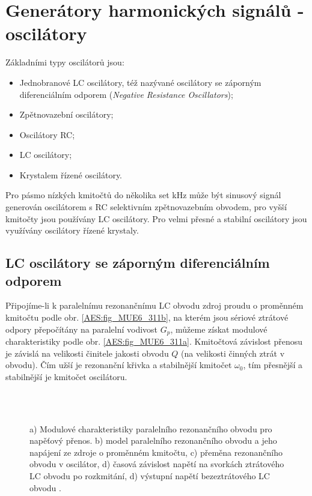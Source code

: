   \section{Generátory harmonických signálů - oscilátory}
    Základními typy oscilátorů jsou:
    \begin{itemize}[noitemsep]
      \item Jednobranové LC oscilátory, též nazývané oscilátory se záporným diferenciálním odporem 
            (\emph{Negative Resistance Oscillators});
      \item Zpětnovazební oscilátory;
      \item Oscilátory RC;
      \item LC oscilátory;
      \item Krystalem řízené oscilátory.
    \end{itemize}

    Pro pásmo nízkých kmitočtů do několika set kHz může být sinusový signál generován oscilátorem s 
    RC selektivním zpětnovazebním obvodem, pro vyšší kmitočty jsou používány LC oscilátory. Pro 
    velmi přesné a stabilní oscilátory jsou využívány oscilátory řízené krystaly.
    
    \subsection{LC oscilátory se záporným diferenciálním odporem}
      Připojíme-li k paralelnímu rezonančnímu LC obvodu zdroj proudu o proměnném kmitočtu podle 
      obr. \ref{AES:fig_MUE6_311b}, na kterém jsou sériové ztrátové odpory přepočítány na paralelní 
      vodivost \(G_p\), můžeme získat modulové charakteristiky podle obr. \ref{AES:fig_MUE6_311a}. 
      Kmitočtová závislost přenosu je závislá na velikosti činitele jakosti obvodu \(Q\) (na 
      velikosti činných ztrát v obvodu). Čím užší je rezonanční křivka a stabilnější kmitočet 
      \(\omega_0\), tím přesnější a stabilnější je kmitočet oscilátoru.

      \begin{figure}[ht!]
        \centering     
          \\
          \\
        \caption{a) Modulové charakteristiky paralelního rezonančního obvodu pro napěťový přenos.
                 b) model paralelního rezonančního obvodu a jeho napájení ze zdroje o proměnném 
                 kmitočtu, c) přeměna rezonančního obvodu v oscilátor, d) časová závislost napětí 
                 na svorkách ztrátového LC obvodu po rozkmitání, d) výstupní napětí bezeztrátového 
                 LC obvodu 
                 \cite[s.~135]{Dolecek2009}.}
        \label{AES:fig_MUE6_311}
      \end{figure}
      
